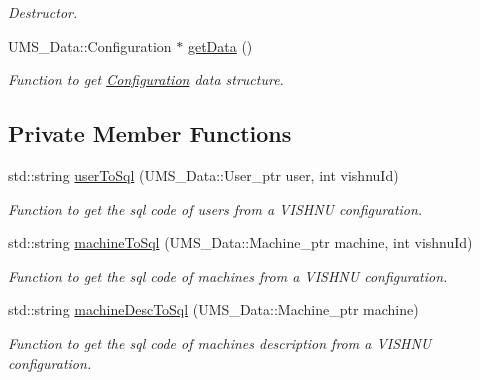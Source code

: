 \begin{DoxyCompactItemize}
\begin{DoxyCompactList}\small\item\em Destructor. \item\end{DoxyCompactList}\item 
UMS\_\-Data::Configuration $\ast$ \hyperlink{classConfigurationServer_ae1ce593072e5a6828128c5c80758604c}{getData} ()
\begin{DoxyCompactList}\small\item\em Function to get \hyperlink{classConfiguration}{Configuration} data structure. \item\end{DoxyCompactList}\end{DoxyCompactItemize}
\subsection*{Private Member Functions}
\begin{DoxyCompactItemize}
\item 
std::string \hyperlink{classConfigurationServer_adfcf50dc485096fe1d109142d0acaaa2}{userToSql} (UMS\_\-Data::User\_\-ptr user, int vishnuId)
\begin{DoxyCompactList}\small\item\em Function to get the sql code of users from a VISHNU configuration. \item\end{DoxyCompactList}\item 
std::string \hyperlink{classConfigurationServer_a6899508cf595a37a05d90b9efe8c9358}{machineToSql} (UMS\_\-Data::Machine\_\-ptr machine, int vishnuId)
\begin{DoxyCompactList}\small\item\em Function to get the sql code of machines from a VISHNU configuration. \item\end{DoxyCompactList}\item 
std::string \hyperlink{classConfigurationServer_a10dc6a2581fce8e24144f9f49e08d58f}{machineDescToSql} (UMS\_\-Data::Machine\_\-ptr machine)
\begin{DoxyCompactList}\small\item\em Function to get the sql code of machines description from a VISHNU configuration. \item\end{DoxyCompactList}\end{DoxyCompactItemize}
